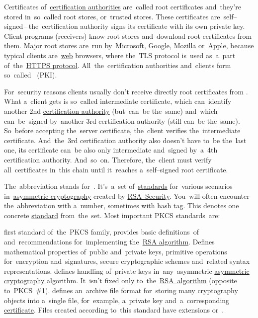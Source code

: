 Certificates of~\hyperref[certificationauthority]{certification authorities} are~called root certificates and~they're stored in~so~called root stores, or~trusted stores.
These certificates are~self--signed\,--\,the~certification authority signs its certificate with its own private key.
Client programs (receivers) know root stores and~download root certificates from them.
Major root stores are~run by~Microsoft, Google, Mozilla or~Apple, because typical clients are~\hyperref[internetweb]{web} browsers, where the~TLS protocol is~used as~a~part of~the~\hyperref[https]{HTTPS protocol}.
All~the~certification authorities and~clients form so~called ~(PKI).

For~security reasons clients usually don't receive directly root certificates from .
What a~client gets is so~called intermediate certificate, which can~identify another 2nd \hyperref[certificationauthority]{certification authority} (but~can~be the~same) and~which can~be~signed by~another 3rd certification authority (still can~be the~same).
So~before accepting the~server certificate, the~client verifies the~intermediate certificate.
And~the~3rd certification authority also doesn't have to~be the~last one, its certificate can~be also only intermediate and~signed by~a~4th certification authority.
And~so~on.
Therefore, the~client must verify all~certificates in~this chain until it~reaches a~self--signed root certificate.

The~abbreviation stands for~.
It's~a~set of~\hyperref[protocolstandard]{standards} for~various scenarios in~\hyperref[asymmetriccryptography]{asymmetric cryptography} created by \href{https://en.wikipedia.org/wiki/RSA_Security}{RSA~Security}.
You~will often encounter the~abbreviation with a~number, sometimes with hash tag.
This denotes one concrete \hyperref[protocolstandard]{standard} from~the~set.
Most important PKCS standards~are:
\begin{itemize}
     first standard of~the~PKCS family, provides basic definitions~of and~recommendations for~implementing the~\hyperref[rsa]{RSA algorithm}.
             Defines mathematical properties of~public and~private keys, primitive operations for~encryption and~signatures, secure cryptographic schemes and~related syntax representations.
     defines handling of~private keys in~any~asymmetric \hyperref[asymmetriccryptography]{asymmetric cryptography} algorithm.
             It~isn't fixed only to~the~\hyperref[rsa]{RSA~algorithm} (opposite to~PKCS~\#1).
     defines an~archive file format for~storing many cryptography objects into a~single file, for~example, a~private key and~a~corresponding \hyperref[certificate]{certificate}.
             Files created according to~this standard have extensions  or~.
\end{itemize}
